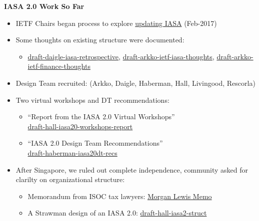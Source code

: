 \documentclass[helvetica]{seminar}
\newcommand{\heading}[1]{%
  \begin{center} 
    \large\bf 
    #1 
  \end{center} 
  \vspace{.4 in}}
\begin{document}
\begin{slide}

\heading{IASA 2.0 Work So Far}

{\footnotesize
  \vspace{-8ex}
\begin{itemize}
\item IETF Chairs began process to explore
  \href{https://mailarchive.ietf.org/arch/msg/ietf/NBhbbeFr-UZq86YnjUn2XKEEDUk}{updating
    IASA} (Feb-2017)
\item Some thoughts on existing structure were documented:
  \begin{itemize}
  \item \href{https://tools.ietf.org/html/draft-daigle-iasa-retrospective-01}{draft-daigle-iasa-retrospective}, \href{https://tools.ietf.org/html/draft-arkko-ietf-iasa-thoughts-00}{draft-arkko-ietf-iasa-thoughts}, \href{https://tools.ietf.org/html/draft-arkko-ietf-finance-thoughts-00}{draft-arkko-ietf-finance-thoughts}
  \end{itemize}
\item Design Team recruited: (Arkko, Daigle, Haberman, Hall,
  Livingood, Rescorla)
\item Two virtual workshops and DT recommendations:
  \begin{itemize}
  \item ``Report from the IASA 2.0 Virtual
    Workshops''\\ \href{https://tools.ietf.org/html/draft-hall-iasa20-workshops-report-00}{draft-hall-iasa20-workshops-report}
  \item ``IASA 2.0 Design Team
    Recommendations''\\ \href{https://tools.ietf.org/html/draft-haberman-iasa20dt-recs-01}{draft-haberman-iasa20dt-recs}
  \end{itemize}
\item After Singapore, we ruled out complete independence, community
  asked for clarilty on organizational structure:
  \begin{itemize}
  \item Memorandum from ISOC tax lawyers:
    \href{https://mailarchive.ietf.org/arch/msg/iasa20/XT_3vfd3OWVFCW335mRrvWuusaI/}{Morgan
      Lewis Memo}
  \item A Strawman design of an IASA 2.0:
    \href{https://datatracker.ietf.org/doc/draft-hall-iasa2-struct/}{draft-hall-iasa2-struct}
  \end{itemize}
\end{itemize}
}
\end{slide}
\end{document}
